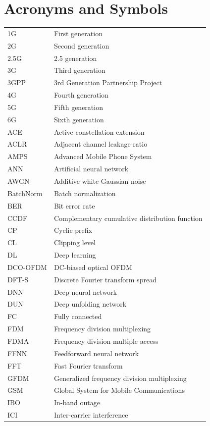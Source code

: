\documentclass[conference]{IEEEtran}
\begin{document}
\section*{Acronyms and Symbols}
\begin{tabular}{ll}
1G & First generation \\
2G & Second generation \\
2.5G & 2.5 generation \\
3G & Third generation \\
3GPP & 3rd Generation Partnership Project \\
4G & Fourth generation \\
5G & Fifth generation \\
6G & Sixth generation \\
ACE & Active constellation extension \\
ACLR & Adjacent channel leakage ratio \\
AMPS & Advanced Mobile Phone System \\
ANN & Artificial neural network \\
AWGN & Additive white Gaussian noise \\
BatchNorm & Batch normalization \\
BER & Bit error rate \\
CCDF & Complementary cumulative distribution function \\
CP & Cyclic prefix \\
CL & Clipping level \\
DL & Deep learning \\
DCO-OFDM & DC-biased optical OFDM \\
DFT-S & Discrete Fourier transform spread \\
DNN & Deep neural network \\
DUN & Deep unfolding network \\
FC & Fully connected \\
FDM & Frequency division multiplexing \\
FDMA & Frequency division multiple access \\
FFNN & Feedforward neural network \\
FFT & Fast Fourier transform \\
GFDM & Generalized frequency division multiplexing \\
GSM & Global System for Mobile Communications \\
IBO & In-band outage \\
ICI & Inter-carrier interference \\

\end{tabular}
\end{document}
